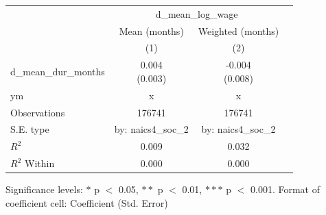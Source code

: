 \renewcommand\cellalign{t}
\begin{threeparttable}
\begin{tabular}{lccc}
\toprule
 & \multicolumn{2}{c}{d_mean_log_wage} \\
\cmidrule(lr){2-3} 
 & Mean (months) & Weighted (months) \\
 & (1) & (2) \\
\midrule
\addlinespace
d_mean_dur_months & \makecell{0.004 \\ (0.003)} & \makecell{-0.004 \\ (0.008)} \\
\midrule
\addlinespace
ym & x & x \\
\midrule
\addlinespace
Observations & 176741 & 176741 \\
S.E. type & by: naics4_soc_2 & by: naics4_soc_2 \\
$R^2$ & 0.009 & 0.032 \\
$R^2$ Within & 0.000 & 0.000 \\
\bottomrule
\end{tabular}
\footnotesize Significance levels: $*$ p $<$ 0.05, $**$ p $<$ 0.01, $***$ p $<$ 0.001. Format of coefficient cell: Coefficient 
 (Std. Error)
\end{threeparttable}